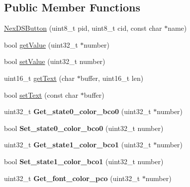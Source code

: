 \subsection*{Public Member Functions}
\begin{DoxyCompactItemize}
\item 
\hyperlink{class_nex_d_s_button_a226edd2467f2fdf54848f5235b808e2b}{Nex\+D\+S\+Button} (uint8\+\_\+t pid, uint8\+\_\+t cid, const char $\ast$name)
\item 
bool \hyperlink{class_nex_d_s_button_a63e08f9a79f326c47aa66e1d0f9648c8}{get\+Value} (uint32\+\_\+t $\ast$number)
\item 
bool \hyperlink{class_nex_d_s_button_a2f696207609e0f01aadebb8b3826b0fa}{set\+Value} (uint32\+\_\+t number)
\item 
uint16\+\_\+t \hyperlink{class_nex_d_s_button_aff0f17061441139bf8797c78e4911eae}{get\+Text} (char $\ast$buffer, uint16\+\_\+t len)
\item 
bool \hyperlink{class_nex_d_s_button_aa7a83123530f2dbb3e6aa909352da5b2}{set\+Text} (const char $\ast$buffer)
\item 
\hypertarget{class_nex_d_s_button_a57119c8695b1dc562319b19864b68203}{uint32\+\_\+t {\bfseries Get\+\_\+state0\+\_\+color\+\_\+bco0} (uint32\+\_\+t $\ast$number)}\label{class_nex_d_s_button_a57119c8695b1dc562319b19864b68203}

\item 
\hypertarget{class_nex_d_s_button_a7276699c1ea7fccf4e52ad05443b8191}{bool {\bfseries Set\+\_\+state0\+\_\+color\+\_\+bco0} (uint32\+\_\+t number)}\label{class_nex_d_s_button_a7276699c1ea7fccf4e52ad05443b8191}

\item 
\hypertarget{class_nex_d_s_button_aa4ce6ec7a670af2df6bd5858ea20e430}{uint32\+\_\+t {\bfseries Get\+\_\+state1\+\_\+color\+\_\+bco1} (uint32\+\_\+t $\ast$number)}\label{class_nex_d_s_button_aa4ce6ec7a670af2df6bd5858ea20e430}

\item 
\hypertarget{class_nex_d_s_button_a42f31d9e9612d7f8403dcf46ef5e8f1a}{bool {\bfseries Set\+\_\+state1\+\_\+color\+\_\+bco1} (uint32\+\_\+t number)}\label{class_nex_d_s_button_a42f31d9e9612d7f8403dcf46ef5e8f1a}

\item 
\hypertarget{class_nex_d_s_button_a01a5a7238547cd761b69c49f1619f955}{uint32\+\_\+t {\bfseries Get\+\_\+font\+\_\+color\+\_\+pco} (uint32\+\_\+t $\ast$number)}\label{class_nex_d_s_button_a01a5a7238547cd761b69c49f1619f955}


\end{DoxyCompactItemize}
